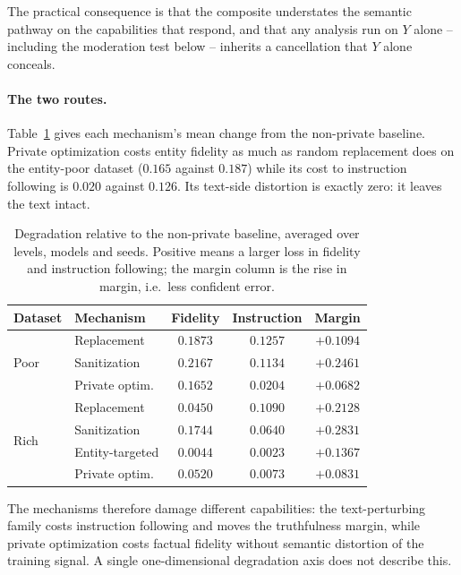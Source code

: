 The practical consequence is that the composite understates the semantic pathway on the capabilities that respond,
and that any analysis run on $Y$ alone -- including the moderation test below -- inherits a cancellation that $Y$ alone conceals.

\paragraph{\label{apx:dissociation}The two routes.}
Table~\ref{tab:delta} gives each mechanism's mean change from the non-private baseline.
Private optimization costs entity fidelity as much as random replacement does on the entity-poor dataset ($0.165$ against $0.187$) while its cost to instruction following is $0.020$ against $0.126$.
Its text-side distortion is exactly zero:
it leaves the text intact.

\begin{table}[t]
  \centering
  \caption{Degradation relative to the non-private baseline,
  averaged over levels,
  models and seeds.
  Positive means a larger loss in fidelity and instruction following;
  the margin column is the rise in margin,
  i.e.\ less confident error.}
  \label{tab:delta}
  \begin{tabular}{llccc}
    \toprule
    Dataset & Mechanism & Fidelity & Instruction & Margin \\
    \midrule
    \multirow{3}{*}{Poor}
      & Replacement    & $0.1873$ & $0.1257$ & $+0.1094$ \\
      & Sanitization   & $0.2167$ & $0.1134$ & $+0.2461$ \\
      & Private optim. & $0.1652$ & $0.0204$ & $+0.0682$ \\
    \midrule
    \multirow{4}{*}{Rich}
      & Replacement    & $0.0450$ & $0.1090$ & $+0.2128$ \\
      & Sanitization   & $0.1744$ & $0.0640$ & $+0.2831$ \\
      & Entity-targeted& $0.0044$ & $0.0023$ & $+0.1367$ \\
      & Private optim. & $0.0520$ & $0.0073$ & $+0.0831$ \\
    \bottomrule
  \end{tabular}
\end{table}

The mechanisms therefore damage different capabilities:
the text-perturbing family costs instruction following and moves the truthfulness margin,
while private optimization costs factual fidelity without semantic distortion of the training signal.
A single one-dimensional degradation axis does not describe this.

